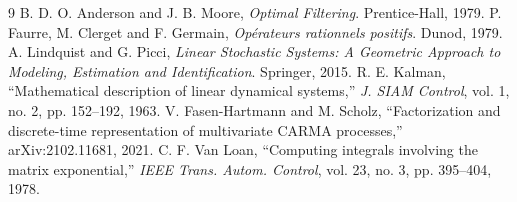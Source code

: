 \documentclass[conference]{IEEEtran}
\theoremstyle{bodysmall}
\begin{document}
\begin{thebibliography}{9}
B. D. O. Anderson and J. B. Moore, \emph{Optimal Filtering}. Prentice-Hall,
1979.
P. Faurre, M. Clerget and F. Germain, \emph{Op\'erateurs rationnels
positifs}. Dunod, 1979.
A. Lindquist and G. Picci, \emph{Linear Stochastic Systems: A Geometric
Approach to Modeling, Estimation and Identification}. Springer, 2015.
R. E. Kalman, ``Mathematical description of linear dynamical systems,''
\emph{J. SIAM Control}, vol. 1, no. 2, pp. 152--192, 1963.
V. Fasen-Hartmann and M. Scholz, ``Factorization and discrete-time
representation of multivariate CARMA processes,'' arXiv:2102.11681, 2021.
C. F. Van Loan, ``Computing integrals involving the matrix exponential,''
\emph{IEEE Trans. Autom. Control}, vol. 23, no. 3, pp. 395--404, 1978.
\end{thebibliography}
\end{document}
